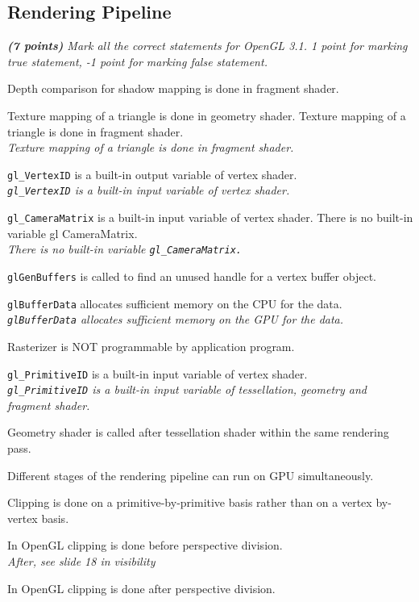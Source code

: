 \documentclass[a4paper,10pt]{article}
\newcommand{\cmark}{\ding{51}}%
\newcommand{\done}{\rlap{$\square$}{\raisebox{2pt}{\large\hspace{1pt}\cmark}}%
	\hspace{-2.5pt}}
\begin{document}
\subsection{Rendering Pipeline}
\textit{\textbf{(7 points)} Mark all the correct statements for OpenGL 3.1. 1 point for marking true statement, -1 point for marking false statement.}
\begin{todolist}
	\item[\done] Depth comparison for shadow mapping is done in fragment shader.
	\item Texture mapping of a triangle is done in geometry shader. Texture mapping of a triangle is done in fragment shader.\\
	\textit{Texture mapping of a triangle is done in fragment shader.}
	\item \texttt{gl\_VertexID} is a built-in output variable of vertex shader.\\
	\textit{\texttt{gl\_VertexID} is a built-in input variable of vertex shader.}	
	\item \texttt{gl\_CameraMatrix} is a built-in input variable of vertex shader. There is no built-in variable gl CameraMatrix.\\
	\textit{There is no built-in variable \texttt{gl\_CameraMatrix.}}
	\item[\done] \texttt{glGenBuffers} is called to find an unused handle for a vertex buffer object.
	\item \texttt{glBufferData} allocates sufficient memory on the CPU for the data. \\
	\textit{\texttt{glBufferData} allocates sufficient memory on the GPU for the data.}
	\item[\done] Rasterizer is NOT programmable by application program.
	\item \texttt{gl\_PrimitiveID} is a built-in input variable of vertex shader. \\
	\textit{\texttt{gl\_PrimitiveID} is a built-in 	input variable of tessellation, geometry and fragment shader.}
	\item[\done] Geometry shader is called after tessellation shader within the same rendering pass. 
	\item[\done] Different stages of the rendering pipeline can run on GPU simultaneously.
	\item[\done] Clipping is done on a primitive-by-primitive basis rather than on a vertex by-vertex basis.
	\item In OpenGL clipping is done before perspective division.\\
	\textit{After, see slide 18 in visibility}
	\item[\done] In OpenGL clipping is done after perspective division.
\end{todolist}
\end{document}
